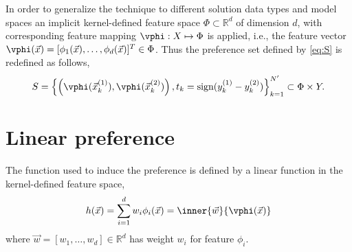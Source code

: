 In order to generalize the technique to different solution data types and model spaces an implicit kernel-defined feature space $\Phi\subset\mathbb{R}^d$ of dimension $d$, with corresponding feature mapping $\vphi:X\mapsto\Phi$ is applied, i.e., the feature vector $\vphi(\vec{x})=[\phi_1(\vec{x}),\ldots,\phi_d(\vec{x})]^T\in\Phi$. Thus the preference set defined by \cref{eq:S} is redefined as follows,
\begin{equation}
S = \left\{\left(\vphi(\vec{x}_k^{(1)}), \vphi(\vec{x}_k^{(2)})\right),t_k=\text{sign}(y_k^{(1)} - y_k^{(2)})\right\}_{k=1}^{N'} \subset \Phi \times Y \label{eq:Sfeat}.
\end{equation}


\section{Linear preference}\label{sec:ord:linpref}
The function used to induce the preference is defined by a linear function in the kernel-defined feature space,
\begin{equation} 
 h(\vec{x})=\sum_{i=1}^d w_i\phi_i(\vec{x})=\inner{\vec{w}}{\vphi(\vec{x})} \label{eq:linearpref}
\end{equation}
where $\vec{w}=[w_1,\ldots,w_d]\in\mathbb{R}^d$ has weight $w_i$ for feature $\phi_i$.


\begin{comment}
Let $\vec{z}$ denote either $\vphi(\vec{x}_k^{(1)})-\vphi(\vec{x}_k^{(2)})$ with \mbox{$t_k=+1$} or 
$\vphi(\vec{x}_k^{(2)})-\vphi(\vec{x}_k^{(1)})$ with \mbox{$t_k=-1$}, positive or negative example respectively.

Logistic regression learns the optimal parameters $\vec{w}\in\mathbb{R}^d$ determined by solving the following task,
\begin{equation}\label{eq:margin}
\min_{\vec{w}}\quad \tfrac{1}{2}\inner{\vec{w}}{\vec{w}} + C \sum_{i=1}^{N'} \log\left(1 + e^{-y_i \inner{\vec{w}}{\vec{z}_i}}\right) 
\end{equation}
where $C > 0$ is a penalty parameter, and the negative log-likelihood is due to the fact the given data point $\vec{z}_i$ and weights $\vec{w}$ are assumed to follow the probability model,
\begin{equation}\label{eq:prob}
\mathcal{P}\big(y=\pm1|\vec{z},\vec{w}\big)=\frac{1}{1+e^{-y\inner{\vec{w}}{\vec{z}_i}}}.
\end{equation}
The logistic regression defined in \cref{eq:margin} is solved iteratively, in particular using Trust Region Newton method \citep[cf.][]{Lin08:newtontrustregion}, which generates a sequence $\{\vec{w}^{(k)}\}_{k=1}^\infty$ converging to the optimal solution $\vec{w}^*$ of \cref{eq:margin}.
\end{comment}


